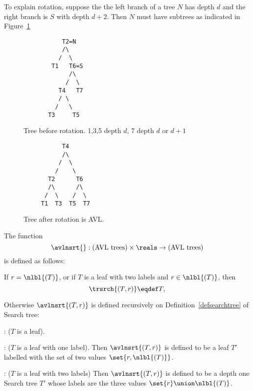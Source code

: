 \begin{definition}
To explain rotation, suppose the the left branch of a tree $N$ has
depth $d$ and the right branch is $S$ with depth $d+2$.  Then $N$ must have
subtrees as indicated in Figure~\ref{rotate1}

\begin{figure}


\begin{verbatim}
           T2=N
           /\
          /  \
        T1   T6=S
             /\
            /  \
          T4   T7
          / \
         /   \
       T3     T5
\end{verbatim}

\caption{Tree before rotation.  1,3,5 depth $d$, 7 depth $d$ or $d+1$}

\label{rotate1}

\end{figure}

\begin{figure}


\begin{verbatim}
           T4
           /\
          /  \
         /    \
       T2      T6
       /\      /\
      /  \    /  \
     T1  T3  T5  T7
\end{verbatim}

\caption{Tree after rotation is AVL.}

\label{rotate2}

\end{figure}

\begin{definition}

The function
\[
\avlnsrt{}: \text{(AVL trees)} \times \reals \to \text{(AVL trees)}
\]
is defined as follows:

If $r = \nlbl{(T)}$, or if $T$ is a leaf with two labels and $r \in
\nlbl{(T)}$, then
\[
\trsrch{(T,r)} \eqdef T,
\]

Otherwise $\avlnsrt{(T,r)}$ is defined recursively on
Definition~\ref{defsearchtree} of Search tree:

: ($T$ is a leaf).

: ($T$ is a leaf with one label).  Then
$\avlnsrt{(T,r)}$ is defined to be a leaf $T'$ labelled with the set
of two values $\set{r,\nlbl{(T)}}$.

\inductioncase{subcase}: ($T$ is a leaf with two labels)
Then $\avlnsrt{(T,r)}$ is defined to be a depth one Search tree $T'$
whose labels are the three values $\set{r} \union \nlbl{(T)}$.


\end{definition}
\end{definition}
